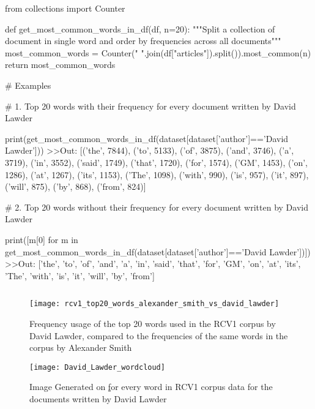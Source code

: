 \begin{python}
	from collections import Counter
	
	def get_most_common_words_in_df(df, n=20):
		"""Split a collection of document in single word and order by frequencies across all documents"""
		most_common_words = Counter(" ".join(df["articles"]).split()).most_common(n)
		return most_common_words
\end{python}
\begin{python}	
	# Examples
	
	# 1. Top 20 words with their frequency for every document written by David Lawder
	
	print(get_most_common_words_in_df(dataset[dataset['author']=='David Lawder']))
	>>Out: [('the', 7844), ('to', 5133), ('of', 3875), ('and', 3746), ('a', 3719), ('in', 3552), ('said', 1749), ('that', 1720), ('for', 1574), ('GM', 1453), ('on', 1286), ('at', 1267), ('its', 1153), ('The', 1098), ('with', 990), ('is', 957), ('it', 897), ('will', 875), ('by', 868), ('from', 824)]
	
	# 2. Top 20 words without their frequency for every document written by David Lawder
	
	print([m[0] for m in get_most_common_words_in_df(dataset[dataset['author']=='David Lawder'])])
	>>Out: ['the',
			'to',
			'of',
			'and',
			'a',
			'in',
			'said',
			'that',
			'for',
			'GM',
			'on',
			'at',
			'its',
			'The',
			'with',
			'is',
			'it',
			'will',
			'by',
			'from']
	
\end{python}
\begin{lstlisting}[frame=none,caption={Top 20 most common words in a document or a collection of document by the same author},captionpos=b,label=lst:MostCommonWords]
\end{lstlisting}

\begin{figure}[ht]
	\centering
	\texttt{[image: rcv1\_top20\_words\_alexander\_smith\_vs\_david\_lawder]}
	\caption[David Lawder vs Alexander Smith top 20 words]{Frequency usage of the top 20 words used in the RCV1 corpus by David Lawder, compared to the frequencies of the same words in the corpus by Alexander Smith}
	\label{fig:chartRCV1ALvsDL}
\end{figure}

\begin{figure}[ht]
	\centering
	\texttt{[image: David\_Lawder\_wordcloud]}
	\caption[David Lawder WordCloud in RCV1]{Image Generated on \href{wordclouds.com} for every word in RCV1 corpus data for the documents written by David Lawder}
	\label{fig:wordcloudDL}
\end{figure}

